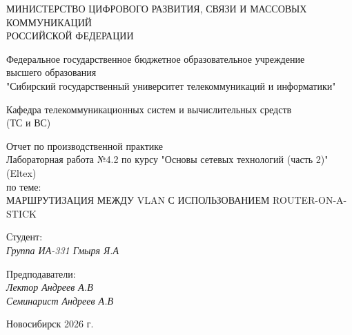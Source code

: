\thispagestyle{empty}

\begin{center}
    МИНИСТЕРСТВО ЦИФРОВОГО РАЗВИТИЯ, СВЯЗИ И МАССОВЫХ КОММУНИКАЦИЙ \\ РОССИЙСКОЙ ФЕДЕРАЦИИ

    \vspace{20pt}

    Федеральное государственное бюджетное образовательное учреждение  \\  высшего образования \\
    "Сибирский государственный университет телекоммуникаций и информатики" \\

    \vspace{20pt}

    Кафедра телекоммуникационных систем и вычислительных средств \\  (ТС и ВС)
\end{center}

\vfill

\begin{center}
    Отчет по производственной практике \\  
    Лабораторная работа №4.2 по курсу "Основы сетевых технологий (часть 2)" (Eltex) \\
    \vspace{20pt}
    по теме: \\
    \uppercase{Маршрутизация между VLAN с использованием Router-on-a-Stick}
\end{center}

\vfill

    \noindent Студент: \\
    \textit{Группа ИА-331 \hfill Гмыря Я.А} 

    \vspace{20pt}
 
    \noindent Предподаватели: \\
    \textit{Лектор \hfill Андреев А.В} \\
    \textit{Семинарист \hfill Андреев А.В}

\vfill

\begin{center}
    Новосибирск 2026 г.
\end{center}